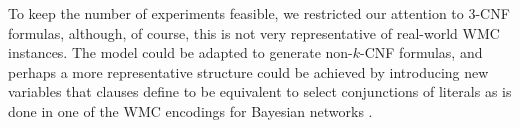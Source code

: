 To keep the number of experiments feasible, we restricted our attention to 3-CNF
formulas, although, of course, this is not very representative of real-world WMC
instances. The model could be adapted to generate non-$k$-CNF formulas, and
perhaps a more representative structure could be achieved by introducing new
variables that clauses define to be equivalent to select conjunctions of
literals as is done in one of the WMC encodings for Bayesian networks
\citep{DBLP:conf/kr/Darwiche02}.

